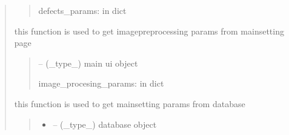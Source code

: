 \documentclass[letterpaper,10pt,english]{sphinxmanual}
\begin{document}
\begin{quote}
\begin{savenotes}
\begin{fulllineitems}
\begin{quote}
\begin{description}
\sphinxAtStartPar
defects\_params: in dict

\end{description}\end{quote}

\end{fulllineitems}\end{savenotes}


\begin{savenotes}\begin{fulllineitems}
\label{\detokenize{setting/backend/mainsetting_funcs:oxin.backend.mainsetting_funcs.get_image_procesing_params_from_ui}}
\pysigstartsignatures
{}
\pysigstopsignatures
\sphinxAtStartPar
this function is used to get image\sphinxhyphen{}preprocessing params from main\sphinxhyphen{}setting page
\begin{quote}\begin{description}
\sphinxAtStartPar
{} – (\_type\_) main ui object

\sphinxAtStartPar
image\_procesing\_params: in dict

\end{description}\end{quote}

\end{fulllineitems}\end{savenotes}


\begin{savenotes}\begin{fulllineitems}
\label{\detokenize{setting/backend/mainsetting_funcs:oxin.backend.mainsetting_funcs.get_mainsetting_params_from_db}}
\pysigstartsignatures
{}
\pysigstopsignatures
\sphinxAtStartPar
this function is used to get mainsetting params from database
\begin{quote}\begin{description}
\begin{itemize}
\item {} 
\sphinxAtStartPar
{} – (\_type\_) database object


\end{itemize}
\end{description}
\end{quote}
\end{fulllineitems}
\end{savenotes}
\end{quote}
\end{document}
